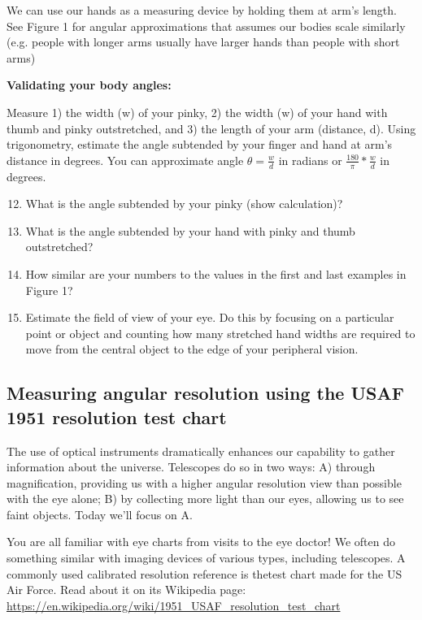 \documentclass[11pt]{article}
\begin{document}
\medskip \noindent
We can use our hands as a measuring device by holding them at arm’s length. See Figure 1 for angular approximations that assumes our bodies scale similarly (e.g. people with longer arms
usually have larger hands than people with short arms)

\bigskip \noindent
\textbf{Validating your body angles:}

\medskip \noindent
Measure 1) the width (w) of your pinky, 2) the width (w) of your hand with thumb and pinky outstretched, and 3) the length of your arm (distance, d). Using trigonometry, estimate the angle subtended by your finger and hand at arm’s distance in degrees. You can approximate angle $\theta = \frac{w}{d}$ in radians or $\frac{180}{\pi}*\frac{w}{d}$ in degrees.

\begin{enumerate}
\setcounter{enumi}{11}
    \item What is the angle subtended by your pinky (show calculation)?
    \item What is the angle subtended by your hand with pinky and thumb outstretched?
    \item How similar are your numbers to the values in the first and last examples in Figure 1?
    \item Estimate the field of view of your eye. Do this by focusing on a particular point or object and counting how many stretched hand widths are required to move from the central object to the edge of your peripheral vision.
\end{enumerate}


\subsection{Measuring angular resolution using the USAF 1951 resolution test chart}
The use of optical instruments dramatically enhances our capability to gather information about the universe. Telescopes do so in two ways: A) through magnification, providing us with a higher angular resolution view than possible with the eye alone; B) by collecting more light than our eyes, allowing us to see faint objects. Today we’ll focus on A.

\medskip \noindent
You are all familiar with eye charts from visits to the eye doctor! We often do something similar
with imaging devices of various types, including telescopes. A commonly used calibrated resolution reference is thetest chart made for the US Air Force. Read about it on its Wikipedia page:
\url{https://en.wikipedia.org/wiki/1951_USAF_resolution_test_chart}
\end{document}

